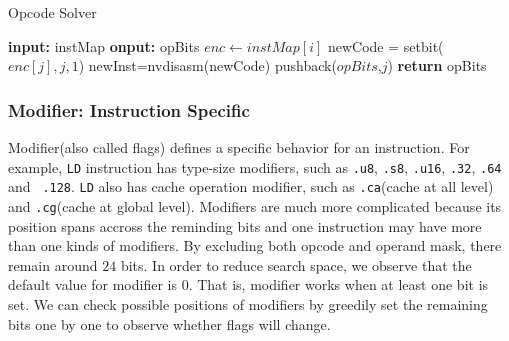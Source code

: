 \begin{algorithm}
      \caption{Opcode Solver}\label{algo:opcode}
  \begin{algorithmic}[1]
      \State \textbf {input:} instMap
      \State \textbf {onput:} opBits
      \State $enc \gets instMap[i]$ 
      \State newCode = setbit($enc[j], j, 1$)
      \State newInst=nvdisasm(newCode)
      \State pushback($opBits$,$j$)
      \EndIf
      \EndIf
      \EndFor
      \EndFor
      \State \textbf{return} opBits
  \end{algorithmic}
\end{algorithm}

\subsubsection{Modifier: Instruction Specific}

Modifier(also called flags) defines a specific behavior for an instruction. For example,
{\tt LD} instruction has type-size modifiers, such as {\tt .u8}, {\tt .s8}, {\tt .u16}, {\tt .32}, {\tt .64} and {\tt 
.128}. {\tt LD} also has cache operation modifier, such as {\tt .ca}(cache at all level) and {\tt .cg}(cache at global 
level). Modifiers are much more complicated because its position spans accross the reminding bits and one instruction 
may have more than one kinds of modifiers. By excluding both opcode and operand mask, there remain around $24$ bits. In 
order to reduce search space, we observe that the default value for modifier is $0$. That is, modifier works when at 
least one bit is set. We can check possible positions of modifiers by greedily set the remaining bits one by one to 
observe whether flags will change.
